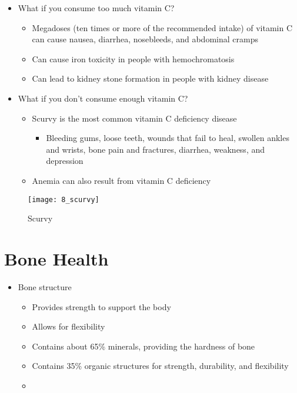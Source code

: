 \documentclass[title={Chapter 9}]{fdsn201notes}
\begin{document}
\begin{itemize}
	\item What if you consume too much vitamin C?
	\begin{itemize}
		\item Megadoses (ten times or more of the recommended intake) of vitamin C can cause nausea, diarrhea, nosebleeds, and abdominal cramps
		\item Can cause iron toxicity in people with hemochromatosis
		\item Can lead to kidney stone formation in people with kidney disease
	\end{itemize}
	\item What if you don’t consume enough vitamin C?
	\begin{itemize}
		\item Scurvy is the most common vitamin C deficiency disease
		\begin{itemize}
			\item Bleeding gums, loose teeth, wounds that fail to heal, swollen ankles and wrists, bone pain and fractures, diarrhea, weakness, and depression
		\end{itemize}
		\item Anemia can also result from vitamin C deficiency
	\end{itemize}
\end{itemize}

\begin{figure}[H]
	\centering
	\texttt{[image: 8\_scurvy]}
	\caption{Scurvy}
	\label{fig:9_scurvy}
\end{figure}

\section{Bone Health}\label{sec:bone-health}
\begin{itemize}
	\item Bone structure
	\begin{itemize}
		\item Provides strength to support the body
		\item Allows for flexibility
		\item Contains about 65\% minerals, providing the hardness of bone
		\item Contains 35\% organic structures for strength, durability, and flexibility
		\item {}
	\end{itemize}
\end{itemize}
\end{document}
